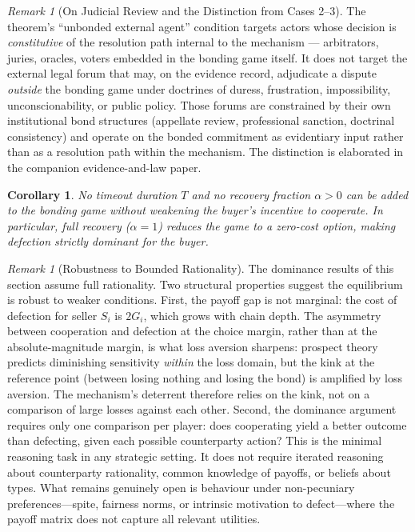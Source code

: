 \documentclass[11pt,a4paper]{article}
\newtheorem{corollary}[theorem]{Corollary}
\theoremstyle{definition}
\theoremstyle{remark}
\newtheorem{remark}[theorem]{Remark}
\newcommand{\cumval}{G}        %
\begin{document}
\begin{remark}[On Judicial Review and the Distinction from Cases 2--3]
\label{rem:judicial-review}
The theorem's ``unbonded external agent'' condition targets actors
whose decision is \emph{constitutive} of the resolution path
internal to the mechanism --- arbitrators, juries, oracles, voters
embedded in the bonding game itself. It does not target the
external legal forum that may, on the evidence record, adjudicate
a dispute \emph{outside} the bonding game under doctrines of
duress, frustration, impossibility, unconscionability, or public
policy. Those forums are constrained by their own institutional
bond structures (appellate review, professional sanction, doctrinal
consistency) and operate on the bonded commitment as evidentiary
input rather than as a resolution path within the mechanism. The
distinction is elaborated in the companion evidence-and-law paper.
\end{remark}

\begin{corollary}\label{cor:no-timeout}
No timeout duration $T$ and no recovery fraction $\alpha > 0$ can be
added to the bonding game without weakening the buyer's incentive to
cooperate. In particular, full recovery ($\alpha = 1$) reduces the
game to a zero-cost option, making defection strictly dominant for
the buyer.
\end{corollary}

\begin{remark}[Robustness to Bounded Rationality]
\label{rem:bounded-rationality}
The dominance results of this section assume full rationality. Two
structural properties suggest the equilibrium is robust to weaker
conditions. First, the payoff gap is not marginal: the cost of
defection for seller $S_i$ is $2\cumval_i$, which grows with chain
depth. The asymmetry between cooperation and defection at the
choice margin, rather than at the absolute-magnitude margin,
is what loss aversion sharpens: prospect theory predicts diminishing
sensitivity \emph{within} the loss domain, but the kink at the
reference point (between losing nothing and losing the bond) is
amplified by loss aversion. The mechanism's deterrent therefore
relies on the kink, not on a comparison of large losses against
each other.
Second, the dominance argument requires only one comparison per
player: does cooperating yield a better outcome than defecting, given
each possible counterparty action? This is the minimal reasoning task
in any strategic setting. It does not require iterated reasoning about
counterparty rationality, common knowledge of payoffs, or beliefs
about types. What remains genuinely open is behaviour under
non-pecuniary preferences---spite, fairness norms, or intrinsic
motivation to defect---where the payoff matrix does not capture all
relevant utilities.
\end{remark}
\end{document}
